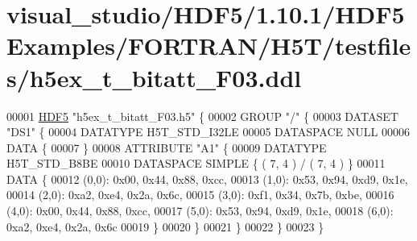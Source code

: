 \hypertarget{visual__studio_2_h_d_f5_21_810_81_2_h_d_f5_examples_2_f_o_r_t_r_a_n_2_h5_t_2testfiles_2h5ex__t__bitatt___f03_8ddl_source}{}\section{visual\+\_\+studio/\+H\+D\+F5/1.10.1/\+H\+D\+F5\+Examples/\+F\+O\+R\+T\+R\+A\+N/\+H5\+T/testfiles/h5ex\+\_\+t\+\_\+bitatt\+\_\+\+F03.ddl}
\label{visual__studio_2_h_d_f5_21_810_81_2_h_d_f5_examples_2_f_o_r_t_r_a_n_2_h5_t_2testfiles_2h5ex__t__bitatt___f03_8ddl_source}

\begin{DoxyCode}
00001 \hyperlink{namespace_h_d_f5}{HDF5} \textcolor{stringliteral}{"h5ex\_t\_bitatt\_F03.h5"} \{
00002 GROUP \textcolor{stringliteral}{"/"} \{
00003    DATASET \textcolor{stringliteral}{"DS1"} \{
00004       DATATYPE  H5T\_STD\_I32LE
00005       DATASPACE  NULL
00006       DATA \{
00007       \}
00008       ATTRIBUTE \textcolor{stringliteral}{"A1"} \{
00009          DATATYPE  H5T\_STD\_B8BE
00010          DATASPACE  SIMPLE \{ ( 7, 4 ) / ( 7, 4 ) \}
00011          DATA \{
00012          (0,0): 0x00, 0x44, 0x88, 0xcc,
00013          (1,0): 0x53, 0x94, 0xd9, 0x1e,
00014          (2,0): 0xa2, 0xe4, 0x2a, 0x6c,
00015          (3,0): 0xf1, 0x34, 0x7b, 0xbe,
00016          (4,0): 0x00, 0x44, 0x88, 0xcc,
00017          (5,0): 0x53, 0x94, 0xd9, 0x1e,
00018          (6,0): 0xa2, 0xe4, 0x2a, 0x6c
00019          \}
00020       \}
00021    \}
00022 \}
00023 \}
\end{DoxyCode}
